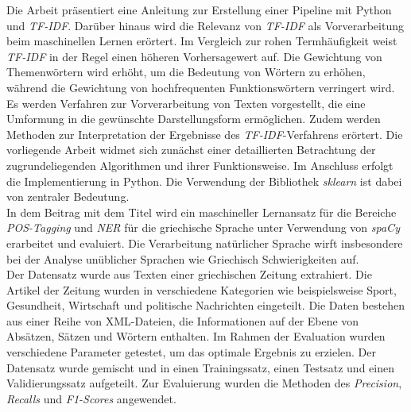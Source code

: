 Die Arbeit \cite{lavin2019analyzing} präsentiert eine Anleitung zur Erstellung einer Pipeline mit Python und \emph{TF-IDF}. Darüber hinaus wird die Relevanz von \emph{TF-IDF} als Vorverarbeitung beim maschinellen Lernen erörtert. Im Vergleich zur rohen Termhäufigkeit weist \emph{TF-IDF} in der Regel einen höheren Vorhersagewert auf. Die Gewichtung von Themenwörtern wird erhöht, um die Bedeutung von Wörtern zu erhöhen, während die Gewichtung von hochfrequenten Funktionswörtern verringert wird. Es werden Verfahren zur Vorverarbeitung von Texten vorgestellt, die eine Umformung in die gewünschte Darstellungsform ermöglichen. Zudem werden Methoden zur Interpretation der Ergebnisse des \emph{TF-IDF}-Verfahrens erörtert. Die vorliegende Arbeit widmet sich zunächst einer detaillierten Betrachtung der zugrundeliegenden Algorithmen und ihrer Funktionsweise. Im Anschluss erfolgt die Implementierung in Python. Die Verwendung der Bibliothek \emph{sklearn} ist dabei von zentraler Bedeutung.\\

In dem Beitrag mit dem Titel \cite{partalidou2019design} wird ein maschineller Lernansatz für die Bereiche \emph{POS-Tagging} und \emph{NER} für die griechische Sprache unter Verwendung von \emph{spaCy} erarbeitet und evaluiert. Die Verarbeitung natürlicher Sprache wirft insbesondere bei der Analyse unüblicher Sprachen wie Griechisch Schwierigkeiten auf.\\ Der Datensatz wurde aus Texten einer griechischen Zeitung extrahiert. Die Artikel der Zeitung wurden in verschiedene Kategorien wie beispielsweise Sport, Gesundheit, Wirtschaft und politische Nachrichten eingeteilt. Die Daten bestehen aus einer Reihe von XML-Dateien, die Informationen auf der Ebene von Absätzen, Sätzen und Wörtern enthalten. Im Rahmen der Evaluation wurden verschiedene Parameter getestet, um das optimale Ergebnis zu erzielen. Der Datensatz wurde gemischt und in einen Trainingssatz, einen Testsatz und einen Validierungssatz aufgeteilt. Zur Evaluierung wurden die Methoden des \emph{Precision}, \emph{Recalls} und \emph{F1-Scores} angewendet.

